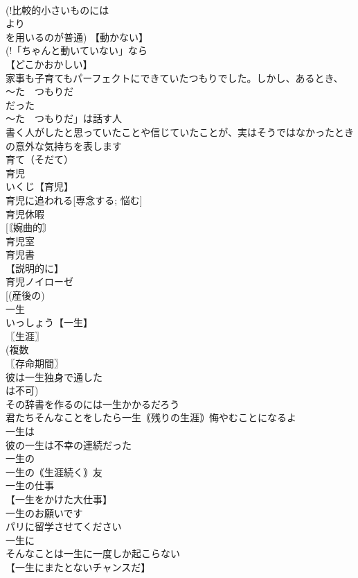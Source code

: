 \documentclass[8pt]{extreport}
\begin{document}
\begin{CJK}{UTF8}{min}
\\	(!比較的小さいものには 
\\	より 
\\	を用いるのが普通) 【動かない】
\\	(!「ちゃんと動いていない」なら 
\\	【どこかおかしい】
\\	家事も子育てもパーフェクトにできていたつもりでした。しかし、あるとき、
\\	〜た　つもりだ 
\\	だった
\\	〜た　つもりだ」は話す人 
\\	書く人がしたと思っていたことや信じていたことが、実はそうではなかったときの意外な気持ちを表します
\\	育て（そだて）
\\	育児		
\\	いくじ【育児】
\\	育児に追われる[専念する; 悩む]
\\	育児休暇
\\	[〘婉曲的〙 
\\	育児室
\\	育児書
\\	【説明的に】
\\	育児ノイローゼ
\\	[(産後の) 
\\	一生		
\\	いっしょう【一生】
\\	〖生涯〗
\\	(複数 
\\	〖存命期間〗
\\	彼は一生独身で通した
\\	は不可)
\\	その辞書を作るのには一生かかるだろう
\\	君たちそんなことをしたら一生｟残りの生涯｠悔やむことになるよ
\\	一生は
\\	彼の一生は不幸の連続だった
\\	一生の
\\	一生の｟生涯続く｠友
\\	一生の仕事
\\	【一生をかけた大仕事】
\\	一生のお願いです
\\	パリに留学させてください
\\	一生に
\\	そんなことは一生に一度しか起こらない
\\	【一生にまたとないチャンスだ】

\end{CJK}
\end{document}
